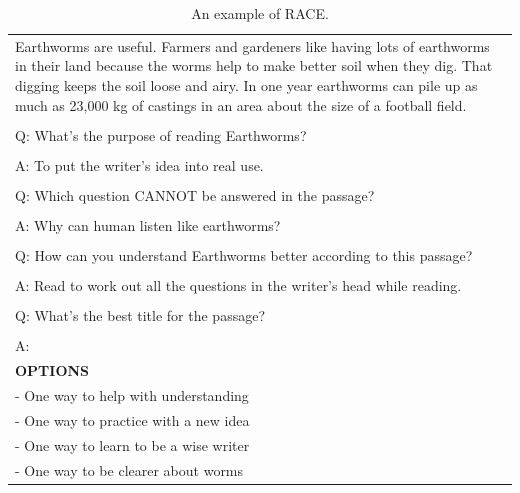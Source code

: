 \begin{table}[h]
\begin{tabular}{p{14cm}}
Earthworms are useful. Farmers and gardeners like having lots of earthworms in their land because the worms help to make better soil when they dig. That digging keeps the soil loose and airy. In one year earthworms can pile up as much as 23,000 kg of castings in an area about the size of a football field.\\
\\
Q: What's the purpose of reading Earthworms?\\
\\
A: To put the writer's idea into real use.\\
\\
Q: Which question CANNOT be answered in the passage?\\
\\
A: Why can human listen like earthworms?\\
\\
Q: How can you understand Earthworms better according to this passage?\\
\\
A: Read to work out all the questions in the writer's head while reading.\\
\\
Q: What's the best title for the passage?\\
\\
A:\\
\midrule
\textbf{OPTIONS}\\
- One way to help with understanding\\
- One way to practice with a new idea\\
- One way to learn to be a wise writer\\
- One way to be clearer about worms\\
\bottomrule
\end{tabular}
    \caption{\centering An example of RACE.}
    \label{tab:race_eval_format_example}
\end{table}

